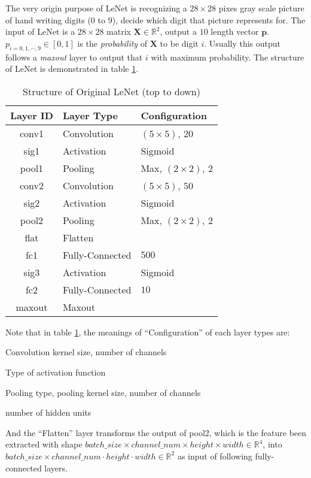 The very origin purpose of LeNet is recognizing a $28 \times 28$ pixes gray scale picture of hand writing digits (0 to 9),
decide which digit that picture represents for. The input of LeNet is a $28 \times 28$ matrix $\mathbf{X} \in \mathbb{R}^2$,
output a $10$ length vector $\mathbf{p}$. $p_{i=0,1,\cdots,9} \in [0, 1]$ is the \textit{probability} of $\mathbf{X}$ to be
digit $i$. Usually this output follows a \textit{maxout} layer to output that $i$ with maximum probability.
The structure of LeNet is demonstrated in table \ref{tab::LeNet}.
\begin{table}[htb]
    \centering
    \begin{tabular}{cll}
        \toprule
        Layer ID & Layer Type & Configuration \\
        \midrule
        conv1 & Convolution & $\left(5\times5\right)$, $20$ \\
        sig1  & Activation  & Sigmoid \\
        pool1 & Pooling     & Max, $\left(2\times2\right)$, $2$ \\
        conv2 & Convolution & $\left(5\times5\right)$, $50$ \\
        sig2  & Activation  & Sigmoid \\
        pool2 & Pooling     & Max, $\left(2\times2\right)$, $2$ \\
        flat  & Flatten     & \\
        fc1   & Fully-Connected & $500$ \\
        sig3  & Activation  & Sigmoid \\
        fc2   & Fully-Connected & $10$ \\
        maxout & Maxout     & \\
        \bottomrule
    \end{tabular}
    \caption{Structure of Original LeNet (top to down)}
    \label{tab::LeNet}
\end{table}
Note that in table \ref{tab::LeNet}, the meanings of ``Configuration'' of each layer types are:
\begin{description}[labelsep=0.5em]
    \item[Convolution] Convolution kernel size, number of channels
    \item[Activation] Type of activation function
    \item[Pooling] Pooling type, pooling kernel size, number of channels
    \item[Fully-Connected] number of hidden units
\end{description}
And the ``Flatten'' layer transforms the output of pool2, which is the feature been extracted
with shape $batch\_size \times channel\_num \times height \times width \in \mathbb{R}^4$, into
$batch\_size \times channel\_num \cdot height \cdot width \in \mathbb{R}^2$ as input of following
fully-connected layers.

